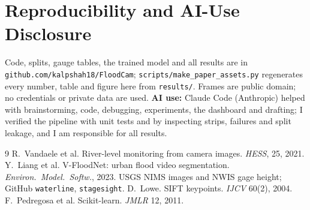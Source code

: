 \documentclass{article}
\begin{document}
\section{Reproducibility and AI-Use Disclosure}
Code, splits, gauge tables, the trained model and all results are in \texttt{github.com/kalpshah18/FloodCam}; \texttt{scripts/make\_paper\_assets.py} regenerates every number, table and figure here from \texttt{results/}. Frames are public domain; no credentials or private data are used. \textbf{AI use:} Claude Code (Anthropic) helped with brainstorming, code, debugging, experiments, the dashboard and drafting; I verified the pipeline with unit tests and by inspecting strips, failures and split leakage, and I am responsible for all results.

\begin{thebibliography}{9}
 R.~Vandaele et al. River-level monitoring from camera images. \emph{HESS}, 25, 2021.
 Y.~Liang et al. V-FloodNet: urban flood video segmentation. \emph{Environ.\ Model.\ Softw.}, 2023.
 USGS NIMS images and NWIS gage height; GitHub \texttt{waterline}, \texttt{stagesight}.
 D.~Lowe. SIFT keypoints. \emph{IJCV} 60(2), 2004.
 F.~Pedregosa et al. Scikit-learn. \emph{JMLR} 12, 2011.
\end{thebibliography}
\end{document}
